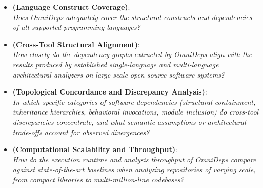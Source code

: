 \begin{itemize}[leftmargin=2.5em]
  \item[\textbf{RQ1}] \textbf{(Language Construct Coverage)}: \\
    \textit{Does OmniDeps adequately cover the structural constructs and
    dependencies of all supported programming languages?}

  \item[\textbf{RQ2}] \textbf{(Cross-Tool Structural Alignment)}: \\
    \textit{How closely do the dependency graphs extracted by
      OmniDeps align with the results produced by established
      single-language and multi-language architectural analyzers on
    large-scale open-source software systems?}

  \item[\textbf{RQ3}] \textbf{(Topological Concordance and
    Discrepancy Analysis)}: \\
    \textit{In which specific categories of software dependencies
      (structural containment, inheritance hierarchies, behavioral
      invocations, module inclusion) do cross-tool discrepancies
      concentrate, and what semantic assumptions or architectural
    trade-offs account for observed divergences?}

  \item[\textbf{RQ4}] \textbf{(Computational Scalability and Throughput)}: \\
    \textit{How do the execution runtime and analysis throughput of
      OmniDeps compare against state-of-the-art baselines when
      analyzing repositories of varying scale, from compact libraries
    to multi-million-line codebases?}
\end{itemize}

